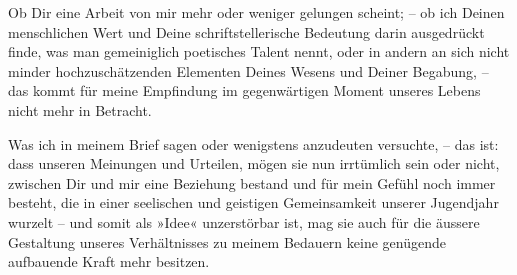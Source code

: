 \pstart
           Ob Dir eine Arbeit von mir mehr oder weniger gelungen scheint; – ob ich Deinen
               menschlichen Wert und Deine schriftstellerische Bedeutung darin ausgedrückt finde,
               was man gemeiniglich poetisches Talent nennt, oder in andern an sich nicht minder
               hochzuschätzenden Elementen Deines Wesens und Deiner Begabung, – das kommt für meine
               Empfindung im gegenwärtigen Moment unseres Lebens nicht mehr in Betracht.\pend
           
\pstart
           Was ich in meinem Brief sagen oder wenigstens anzudeuten versuchte, – das ist: dass
                   unseren Meinungen und Urteilen, mögen sie nun
               irrtümlich sein oder nicht, zwischen Dir und mir eine Beziehung bestand und für mein
               Gefühl noch immer besteht, die in einer seelischen und geistigen Gemeinsamkeit
               unserer Jugendjahr wurzelt – und somit als »Idee« unzerstörbar ist, mag sie auch {\pb}für die äussere Gestaltung unseres Verhältnisses zu
               meinem Bedauern keine genügende aufbauende Kraft mehr besitzen.\pend
           
